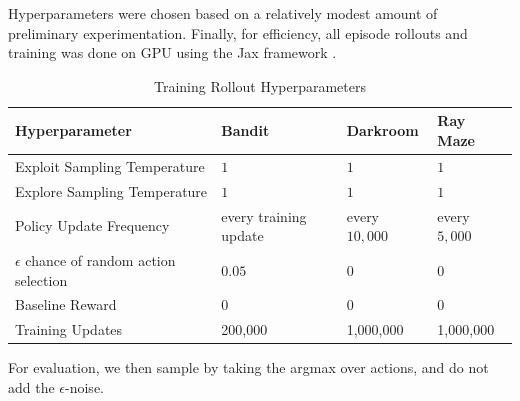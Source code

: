 \documentclass{article}
\begin{document}
Hyperparameters were chosen based on a relatively modest amount of preliminary experimentation. Finally, for efficiency, all episode rollouts and training was done on GPU using the Jax framework \citep{jax2018github}.
\begin{table}[h]
\caption{Training Rollout Hyperparameters}
\label{rollhyper}
\centering
\begin{tabular}{llll}
\toprule
Hyperparameter   & Bandit & Darkroom & Ray Maze\\ \midrule
Exploit Sampling Temperature & \(1\) & \(1\) & \(1\)\\
Explore Sampling Temperature & \(1\) & \(1\) & \(1\)\\
Policy Update Frequency &  every training update & every \(10,000\) & every \(5,000\)\\
\(\epsilon\) chance of random action selection & \(0.05\) & \(0\) & \(0\)\\
Baseline Reward & \(0\) & \(0\) & \(0\)\\
Training Updates & 200,000 &  1,000,000 &  1,000,000 \\
\bottomrule
\end{tabular}
\label{table:training}
\end{table}
For evaluation, we then sample by taking the argmax over actions, and do not add the \(\epsilon\)-noise.
\FloatBarrier
\end{document}
